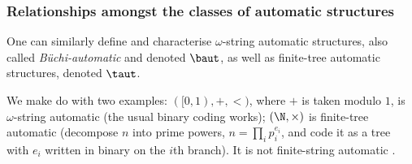 







\subsubsection{Relationships amongst the classes of automatic structures}


One can similarly define and characterise $\omega$-string automatic structures, also called {\em B\"uchi-automatic} and denoted $\baut$, as well as
finite-tree automatic structures, denoted $\taut$.

We make do with two examples: $([0,1),+,<)$, where $+$ is taken modulo $1$, is $\omega$-string automatic 
(the usual binary coding works); $(\N,\times)$ is finite-tree automatic (decompose $n$ into prime powers,
$n=\prod_{i} p_i^{e_i}$, and code it as a tree with $e_i$ written in binary on
the $i$th branch). It is not finite-string automatic \cite{Blum99}.

